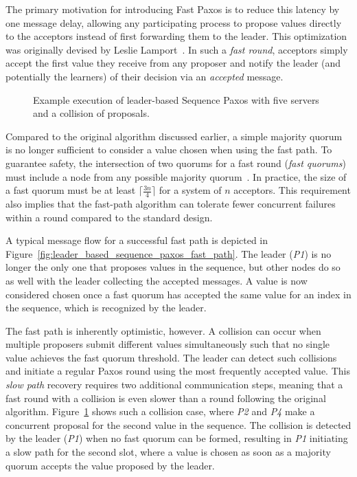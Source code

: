 The primary motivation for introducing Fast Paxos is to reduce this latency by one message delay, allowing any participating process to propose values directly to the acceptors instead of first forwarding them to the leader. This optimization was originally devised by Leslie Lamport~\cite{Lamport-FastPaxos-2006}. In such a \textit{fast round}, acceptors simply accept the first value they receive from any proposer and notify the leader (and potentially the learners) of their decision via an \textit{accepted} message.

\begin{figure}[t]
    \centering
    
    \caption{Example execution of leader-based Sequence Paxos with five servers and a collision of proposals.}
    \label{fig:leader_based_sequence_paxos_fast_path_collision}
\end{figure}

Compared to the original algorithm discussed earlier, a simple majority quorum is no longer sufficient to consider a value chosen when using the fast path. To guarantee safety, the intersection of two quorums for a fast round (\textit{fast quorums}) must include a node from any possible majority quorum~\cite{Zhao-FastPaxos-2015}. In practice, the size of a fast quorum must be at least $\lceil \frac{3n}{4} \rceil$ for a system of $n$ acceptors. This requirement also implies that the fast-path algorithm can tolerate fewer concurrent failures within a round compared to the standard design.

A typical message flow for a successful fast path is depicted in Figure~\ref{fig:leader_based_sequence_paxos_fast_path}. The leader (\textit{P1}) is no longer the only one that proposes values in the sequence, but other nodes do so as well with the leader collecting the accepted messages. A value is now considered chosen once a fast quorum has accepted the same value for an index in the sequence, which is recognized by the leader.

The fast path is inherently optimistic, however. A collision can occur when multiple proposers submit different values simultaneously such that no single value achieves the fast quorum threshold. The leader can detect such collisions and initiate a regular Paxos round using the most frequently accepted value. This \textit{slow path} recovery requires two additional communication steps, meaning that a fast round with a collision is even slower than a round following the original algorithm. Figure~\ref{fig:leader_based_sequence_paxos_fast_path_collision} shows such a collision case, where \textit{P2} and \textit{P4} make a concurrent proposal for the second value in the sequence. The collision is detected by the leader (\textit{P1}) when no fast quorum can be formed, resulting in \textit{P1} initiating a slow path for the second slot, where a value is chosen as soon as a majority quorum accepts the value proposed by the leader.

